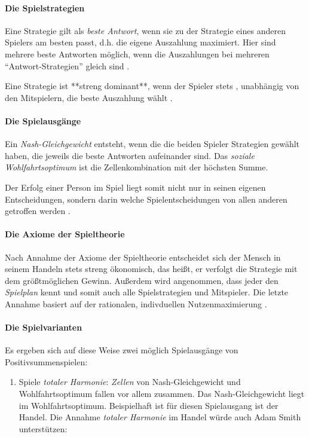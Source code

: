 {\paragraph{Die Spielstrategien}

Eine Strategie gilt als \emph{beste Antwort}, wenn sie zu der Strategie eines anderen Spielers am besten passt, d.h. die eigene Auszahlung maximiert.
Hier sind mehrere beste Antworten möglich, wenn die Auszahlungen bei mehreren ``Antwort-Strategien'' gleich sind \parencite[vgl.][153]{Kleinberg-2009-oz}.

Eine Strategie ist **streng dominant**, wenn der Spieler  stets , unabhängig von den Mitspielern, die beste Auszahlung wählt \parencite[vgl.][164]{Kleinberg-2009-oz}.


\paragraph{Die Spielausgänge}

Ein \emph{Nash-Gleichgewicht } entsteht, wenn die die beiden Spieler Strategien gewählt haben, die jeweils die beste Antworten aufeinander sind.
Das \emph{soziale Wohlfahrtsoptimum} ist die Zellenkombination mit der höchsten Summe.

Der Erfolg einer Person im Spiel liegt somit nicht nur in seinen eigenen Entscheidungen, sondern darin welche Spielentscheidungen von allen anderen getroffen werden \parencite[vgl.][156]{Kleinberg-2009-oz}.


\paragraph{Die Axiome der Spieltheorie}

Nach Annahme der Axiome der Spieltheorie entscheidet sich der Mensch in seinem Handeln stets streng ökonomisch, das heißt, er verfolgt die Strategie mit dem größtmöglichen Gewinn.
Außerdem wird angenommen, dass jeder den \emph{Spielplan} kennt und somit auch alle Spielstrategien und Mitspieler.
Die letzte Annahme basiert auf der rationalen, indivduellen Nutzenmaximierung \parencite[vgl.][159]{Kleinberg-2009-oz}.


\paragraph{Die Spielvarianten}

Es ergeben sich auf diese Weise zwei möglich Spielausgänge von Positivsummenspielen:

\begin{enumerate}
		\item Spiele \emph{totaler Harmonie}: \emph{Zellen} von Nash-Gleichgewicht und Wohlfahrtsoptimum fallen vor allem zusammen. Das Nash-Gleichgewicht liegt im Wohlfahrtsoptimum.
		Beispielhaft ist für diesen Spielausgang ist der Handel.
		Die Annahme \emph{totaler Harmonie} im Handel würde auch Adam Smith unterstützen:


\end{enumerate}}
